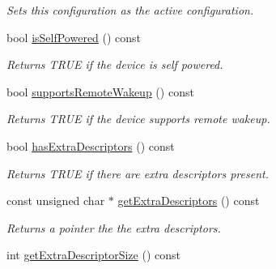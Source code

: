 \begin{DoxyCompactItemize}
\begin{DoxyCompactList}\small\item\em Sets this configuration as the active configuration. \end{DoxyCompactList}\item 
\hypertarget{class_lib_u_s_b_1_1_configuration_a33184cf73b15b78ad7043964e121c3a8}{bool \hyperlink{class_lib_u_s_b_1_1_configuration_a33184cf73b15b78ad7043964e121c3a8}{is\-Self\-Powered} () const }\label{class_lib_u_s_b_1_1_configuration_a33184cf73b15b78ad7043964e121c3a8}

\begin{DoxyCompactList}\small\item\em Returns T\-R\-U\-E if the device is self powered. \end{DoxyCompactList}\item 
\hypertarget{class_lib_u_s_b_1_1_configuration_afa9e4a6df05bf3a591d587a297849532}{bool \hyperlink{class_lib_u_s_b_1_1_configuration_afa9e4a6df05bf3a591d587a297849532}{supports\-Remote\-Wakeup} () const }\label{class_lib_u_s_b_1_1_configuration_afa9e4a6df05bf3a591d587a297849532}

\begin{DoxyCompactList}\small\item\em Returns T\-R\-U\-E if the device supports remote wakeup. \end{DoxyCompactList}\item 
\hypertarget{class_lib_u_s_b_1_1_configuration_a4c6821c0a615aa153310fb5b7fcf82ca}{bool \hyperlink{class_lib_u_s_b_1_1_configuration_a4c6821c0a615aa153310fb5b7fcf82ca}{has\-Extra\-Descriptors} () const }\label{class_lib_u_s_b_1_1_configuration_a4c6821c0a615aa153310fb5b7fcf82ca}

\begin{DoxyCompactList}\small\item\em Returns T\-R\-U\-E if there are extra descriptors present. \end{DoxyCompactList}\item 
\hypertarget{class_lib_u_s_b_1_1_configuration_ad05ae5f0d18011aec213b9f86be94f77}{const unsigned char $\ast$ \hyperlink{class_lib_u_s_b_1_1_configuration_ad05ae5f0d18011aec213b9f86be94f77}{get\-Extra\-Descriptors} () const }\label{class_lib_u_s_b_1_1_configuration_ad05ae5f0d18011aec213b9f86be94f77}

\begin{DoxyCompactList}\small\item\em Returns a pointer the the extra descriptors. \end{DoxyCompactList}\item 
\hypertarget{class_lib_u_s_b_1_1_configuration_a34e0423ff0c3051ee83999d3fd489c5b}{int \hyperlink{class_lib_u_s_b_1_1_configuration_a34e0423ff0c3051ee83999d3fd489c5b}{get\-Extra\-Descriptor\-Size} () const }\label{class_lib_u_s_b_1_1_configuration_a34e0423ff0c3051ee83999d3fd489c5b}


\end{DoxyCompactItemize}
